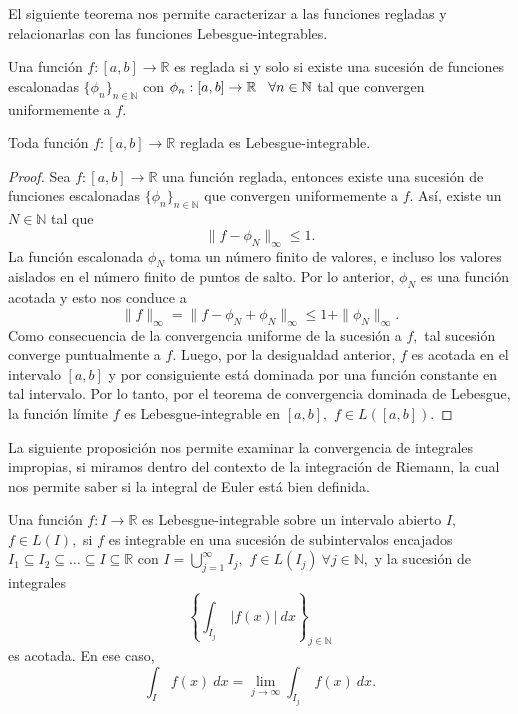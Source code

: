El siguiente teorema nos permite caracterizar a las funciones regladas y relacionarlas con las funciones Lebesgue-integrables.
\begin{theorem}
	Una función $f: [a,b] \rightarrow \mathbb{R}$ es reglada si y solo si existe una sucesión de funciones escalonadas $\{\phi_n \}_{n \in \mathbb{N}}$ con $\phi_n: [a,b] \rightarrow \mathbb{R}\hspace{0.3cm}\forall n \in \mathbb{N}$ tal que convergen uniformemente a $f.$
\end{theorem}
\begin{proposition}
	Toda función $f: [a,b] \rightarrow \mathbb{R}$ reglada es Lebesgue-integrable.
\end{proposition}
\begin{proof}
	Sea $f: [a,b] \rightarrow \mathbb{R}$ una función reglada, entonces existe una sucesión de funciones escalonadas $\{\phi_n\}_{n \in \mathbb{N}}$ que convergen uniformemente a $f.$ Así, existe un $N \in \mathbb{N}$ tal que $$\|f-\phi_N\|_\infty \leq 1.$$ La función escalonada $\phi_N$ toma un número finito de valores, e incluso los valores aislados en el número finito de puntos de salto. Por lo anterior, $\phi_N$ es una función acotada y esto nos conduce a $$\|f\|_\infty = \|f-\phi_N+\phi_N\|_\infty \leq 1+\|\phi_N\|_\infty.$$ Como consecuencia de la convergencia uniforme de la sucesión a $f,$ tal sucesión converge puntualmente a $f.$ Luego, por la desigualdad anterior, $f$ es acotada en el intervalo $[a,b]$ y por consiguiente está dominada por una función constante en tal intervalo. Por lo tanto, por el teorema de convergencia dominada de Lebesgue, la función límite $f$ es Lebesgue-integrable en $[a,b],$ $f \in L([a,b]).$
\end{proof}
La siguiente proposición nos permite examinar la convergencia de integrales impropias, si miramos dentro del contexto de la integración de Riemann, la cual nos permite saber si la integral de Euler está bien definida.
\begin{proposition}
	Una función $f: I \rightarrow \mathbb{R}$ es Lebesgue-integrable sobre un intervalo abierto $I,$ $f \in L(I),$ si $f$ es integrable en una sucesión de subintervalos encajados $I_1 \subseteq I_2 \subseteq \dots \subseteq I \subseteq \mathbb{R}$ con $I = \bigcup_{j = 1}^\infty I_j,$ $f \in L(I_j)\ \forall j \in \mathbb{N},$ y la sucesión de integrales $$\left\{\int_{I_j}\ |f(x)|\ dx\right\}_{j \in \mathbb{N}}$$ es acotada. En ese caso, $$\int_{I}\ f(x)\ dx = \lim_{j \rightarrow \infty}\int_{I_j}\ f(x)\ dx.$$
\end{proposition}
